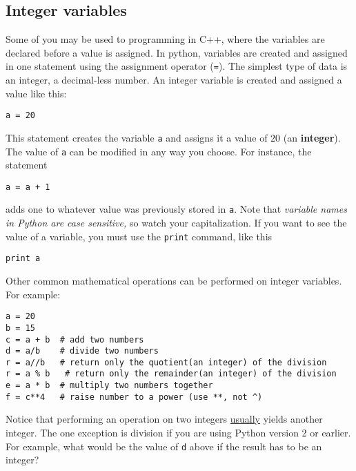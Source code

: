 \subsection*{Integer variables}
Some of you may be used to programming in C++, where
the variables are declared before a value is assigned.  In python,
variables are created and assigned in one statement using the
assignment operator (\texttt{=}).  The simplest type of data is an
integer, a decimal-less number.  An integer variable is created and
assigned a value like this:
\begin{Verbatim}
a = 20
\end{Verbatim}
This statement creates the variable {\tt a} and assigns it a value of
$20$ (an \textbf{integer}).  The value of \texttt{a} can be modified in
any way you choose.  For instance, the statement
\begin{Verbatim}
a = a + 1
\end{Verbatim}
adds one to whatever value was previously stored in
\texttt{a}.   Note that {\it variable names
  in Python are case sensitive,} so watch your capitalization.
 If you want to see the value of a variable, you
must use the \texttt{print} command, like this
\begin{Verbatim}
print a
\end{Verbatim}
Other common mathematical operations can be performed on integer
variables.  For example:
\begin{Verbatim}
a = 20
b = 15
c = a + b  # add two numbers
d = a/b    # divide two numbers  
r = a//b   # return only the quotient(an integer) of the division
r = a % b   # return only the remainder(an integer) of the division
e = a * b  # multiply two numbers together
f = c**4   # raise number to a power (use **, not ^)
\end{Verbatim}
Notice that performing an operation on two integers \ul{usually}
yields another integer.  The one exception is division if you are
using Python version 2 or earlier.  For
example, what would be the value of \texttt{d} above if the result has
to be an integer? 

